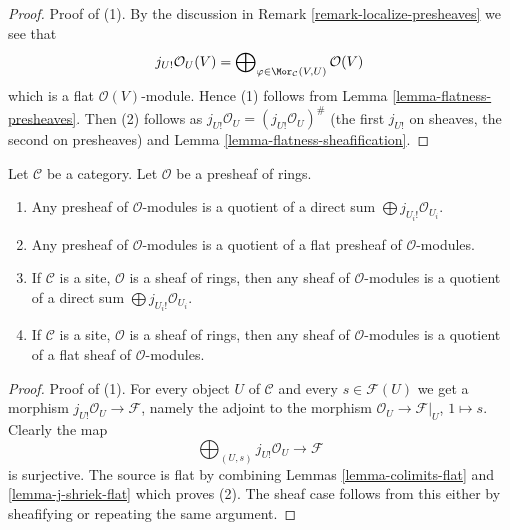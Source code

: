 \begin{proof}
Proof of (1). By the discussion in
Remark \ref{remark-localize-presheaves}
we see that
$$
j_{U!}\mathcal{O}_U(V)
=
\bigoplus\nolimits_{\varphi \in \Mor_\mathcal{C}(V, U)}
\mathcal{O}(V)
$$
which is a flat $\mathcal{O}(V)$-module. Hence (1) follows from
Lemma \ref{lemma-flatness-presheaves}.
Then (2) follows as $j_{U!}\mathcal{O}_U = (j_{U!}\mathcal{O}_U)^\#$
(the first $j_{U!}$ on sheaves, the second on presheaves)
and Lemma \ref{lemma-flatness-sheafification}.
\end{proof}

\begin{lemma}
\label{lemma-module-quotient-flat}
Let $\mathcal{C}$ be a category.
Let $\mathcal{O}$ be a presheaf of rings.
\begin{enumerate}
\item Any presheaf of $\mathcal{O}$-modules is a quotient of
a direct sum $\bigoplus j_{U_i!}\mathcal{O}_{U_i}$.
\item Any presheaf of $\mathcal{O}$-modules is a quotient of
a flat presheaf of $\mathcal{O}$-modules.
\item If $\mathcal{C}$ is a site, $\mathcal{O}$ is a sheaf of rings,
then any sheaf of $\mathcal{O}$-modules is a quotient of
a direct sum $\bigoplus j_{U_i!}\mathcal{O}_{U_i}$.
\item If $\mathcal{C}$ is a site, $\mathcal{O}$ is a sheaf of rings,
then any sheaf of $\mathcal{O}$-modules is a quotient of
a flat sheaf of $\mathcal{O}$-modules.
\end{enumerate}
\end{lemma}

\begin{proof}
Proof of (1). For every object $U$ of $\mathcal{C}$ and every
$s \in \mathcal{F}(U)$ we get a morphism
$j_{U!}\mathcal{O}_U \to \mathcal{F}$, namely the adjoint to
the morphism $\mathcal{O}_U \to \mathcal{F}|_U$, $1 \mapsto s$.
Clearly the map
$$
\bigoplus\nolimits_{(U, s)} j_{U!}\mathcal{O}_U
\longrightarrow
\mathcal{F}
$$
is surjective. The source is flat by combining Lemmas
\ref{lemma-colimits-flat} and \ref{lemma-j-shriek-flat}
which proves (2). The sheaf case follows from this either by
sheafifying or repeating the same argument.
\end{proof}

